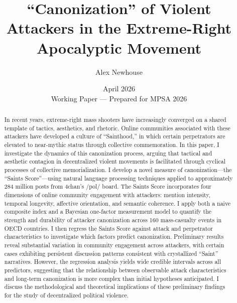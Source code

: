 \documentclass[12pt]{article}
\title{``Canonization'' of Violent Attackers in the Extreme-Right Apocalyptic Movement}
\author{Alex Newhouse}
\date{April 2026 \\ \vspace{0.5em} \small Working Paper --- Prepared for MPSA 2026}
\begin{document}
\doublespacing

\maketitle

\begin{abstract}
\noindent In recent years, extreme-right mass shooters have increasingly converged on a shared template of tactics, aesthetics, and rhetoric. Online communities associated with these attackers have developed a culture of ``Sainthood,'' in which certain perpetrators are elevated to near-mythic status through collective commemoration. In this paper, I investigate the dynamics of this canonization process, arguing that tactical and aesthetic contagion in decentralized violent movements is facilitated through cyclical processes of collective memorialization. I develop a novel measure of canonization---the ``Saints Score''---using natural language processing techniques applied to approximately 284 million posts from 4chan's /pol/ board. The Saints Score incorporates four dimensions of online community engagement with attackers: mention intensity, temporal longevity, affective orientation, and semantic coherence. I apply both a naive composite index and a Bayesian one-factor measurement model to quantify the strength and durability of attacker canonization across 160 mass-casualty events in OECD countries. I then regress the Saints Score against attack and perpetrator characteristics to investigate which factors predict canonization. Preliminary results reveal substantial variation in community engagement across attackers, with certain cases exhibiting persistent discussion patterns consistent with crystallized ``Saint'' narratives. However, the regression analysis yields wide credible intervals across all predictors, suggesting that the relationship between observable attack characteristics and long-term canonization is more complex than initial hypotheses anticipated. I discuss the methodological and theoretical implications of these preliminary findings for the study of decentralized political violence.
\end{abstract}

\newpage
\end{document}
